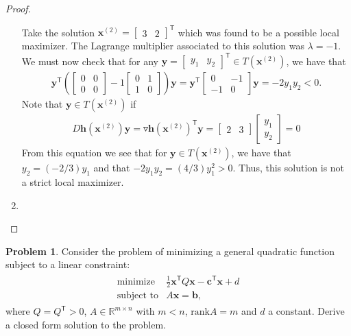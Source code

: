 \documentclass[12pt]{article}
\theoremstyle{definition}
\newtheorem{problem}{Problem}
\newcommand{\vc}[1]{\boldsymbol{#1}}
\newcommand{\tran}{\mathsf{T}}
\begin{document}
\begin{proof}
\begin{enumerate}
      Take the solution $\vc{x}^{(2)} = \begin{bmatrix}3 & 2\end{bmatrix}^\tran$ which was found to be
      a possible local maximizer. The Lagrange multiplier associated to this solution was $\lambda=-1$. We must
      now check that for any $\vc{y} = \begin{bmatrix}y_1 & y_2\end{bmatrix}^\tran\in T(\vc{x}^{(2)})$, we have that
      \begin{align*}
        \vc{y}^\tran \left(\begin{bmatrix}0 & 0 \\ 0 & 0\end{bmatrix} -1 \begin{bmatrix}0 & 1 \\ 1 & 0\end{bmatrix}\right) \vc{y} =
        \vc{y}^\tran \begin{bmatrix}0 & -1 \\ -1 & 0\end{bmatrix} \vc{y} = -2y_1 y_2 < 0.
      \end{align*}
      Note that $\vc{y}\in T(\vc{x}^{(2)})$ if
      \begin{align*}
        D \vc{h}(\vc{x}^{(2)})\vc{y} = \triangledown \vc{h}(\vc{x}^{(2)})^\tran \vc{y} = \begin{bmatrix}2 & 3\end{bmatrix}\begin{bmatrix}y_1 \\ y_2\end{bmatrix} = 0
      \end{align*}
      From this equation we see that for $\vc{y}\in T(\vc{x}^{(2)})$, we have that $y_2 = (-2/3 )y_1$ and that $-2y_1 y_2 = (4/3)y_1^2 > 0$.
      Thus, this solution is not a strict local maximizer.

    \item
  \end{enumerate}
\end{proof}
\newpage


\begin{problem}
  Consider the problem of minimizing a general quadratic function subject to a linear constraint:
  \begin{align*}
    \begin{array}{rl}
      \text{minimize} & \frac{1}{2} \vc{x}^\tran Q \vc{x} - \vc{c}^\tran \vc{x} + d\\
      \text{subject to} & A\vc{x} = \vc{b},
    \end{array}
  \end{align*}
  where $Q=Q^\tran > 0$, $A \in\mathbb{R}^{m \times n}$ with $m<n$, $\text{rank} A = m$ and $d$ a constant.
  Derive a closed form solution to the problem.
\end{problem}
\end{document}

